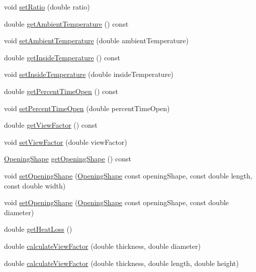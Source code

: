 \begin{DoxyCompactItemize}
void \hyperlink{class_opening_losses_aab7f82f24511c37f0bc4b29cbc7239b5}{set\+Ratio} (double ratio)
\item 
double \hyperlink{class_opening_losses_a198f46508744d6943846ea95a9513a45}{get\+Ambient\+Temperature} () const
\item 
void \hyperlink{class_opening_losses_a3624c9fad2a413871b7324f7e957a5ae}{set\+Ambient\+Temperature} (double ambient\+Temperature)
\item 
double \hyperlink{class_opening_losses_abe930dab77b1c855503ee51fdf66c88a}{get\+Inside\+Temperature} () const
\item 
void \hyperlink{class_opening_losses_a895dcaa81bbb3dc823ec903480f05262}{set\+Inside\+Temperature} (double inside\+Temperature)
\item 
double \hyperlink{class_opening_losses_aeefc3790a569008ff2e804033a9efea3}{get\+Percent\+Time\+Open} () const
\item 
void \hyperlink{class_opening_losses_a889b6aa25bf6d8fc8fb284ec0c2a1625}{set\+Percent\+Time\+Open} (double percent\+Time\+Open)
\item 
double \hyperlink{class_opening_losses_ae6633fab7a941e00b9770bee6a3af34d}{get\+View\+Factor} () const
\item 
void \hyperlink{class_opening_losses_a4e6c6f1549e01cd4b82b7505e403d643}{set\+View\+Factor} (double view\+Factor)
\item 
\hyperlink{class_opening_losses_a57f9759b6fd72a1b75aa885800e26157}{Opening\+Shape} \hyperlink{class_opening_losses_a5046cd699178e4edca774d0d0da7965a}{get\+Opening\+Shape} () const
\item 
void \hyperlink{class_opening_losses_a19c28e02d1e736d74b3c82047d4d23b2}{set\+Opening\+Shape} (\hyperlink{class_opening_losses_a57f9759b6fd72a1b75aa885800e26157}{Opening\+Shape} const opening\+Shape, const double length, const double width)
\item 
void \hyperlink{class_opening_losses_afb0e0884b0e60db8cb6674228cf3aafe}{set\+Opening\+Shape} (\hyperlink{class_opening_losses_a57f9759b6fd72a1b75aa885800e26157}{Opening\+Shape} const opening\+Shape, const double diameter)
\item 
double \hyperlink{class_opening_losses_a38112eb408f72e252b42a68a41a25d0f}{get\+Heat\+Loss} ()
\item 
double \hyperlink{class_opening_losses_aa8ffc249e49ee7f8413f32f7e803524a}{calculate\+View\+Factor} (double thickness, double diameter)
\item 
double \hyperlink{class_opening_losses_abef4b1d97525d3cdab0bc5587ab12f91}{calculate\+View\+Factor} (double thickness, double length, double height)

\end{DoxyCompactItemize}
